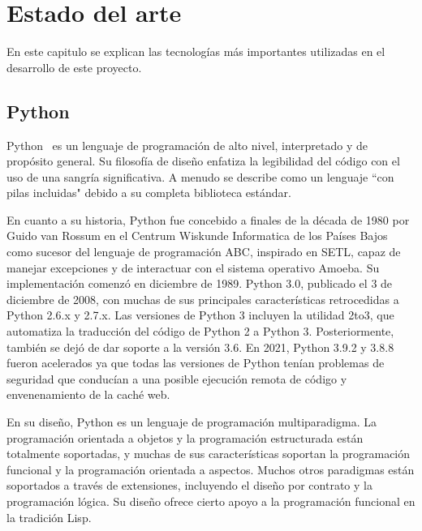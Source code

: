 \documentclass[a4paper, 12pt]{book}
\begin{document}

\cleardoublepage
\chapter{Estado del arte}
\label{chap:estado}

En este capitulo se explican las tecnologías más importantes utilizadas en el desarrollo de este proyecto.

\section{Python}
\label{sec:Python}

Python~\cite{website:Python} es un lenguaje de programación de alto nivel, interpretado y de propósito general. Su filosofía de diseño enfatiza la legibilidad del código con el uso de una sangría significativa. A menudo se describe como un lenguaje ``con pilas incluidas" debido a su completa biblioteca estándar. 

En cuanto a su historia, Python fue concebido a finales de la década de 1980 por Guido van Rossum en el Centrum Wiskunde Informatica de los Países Bajos como sucesor del lenguaje de programación ABC, inspirado en SETL, capaz de manejar excepciones y de interactuar con el sistema operativo Amoeba. Su implementación comenzó en diciembre de 1989. Python 3.0, publicado el 3 de diciembre de 2008, con muchas de sus principales características retrocedidas a Python 2.6.x y 2.7.x. Las versiones de Python 3 incluyen la utilidad 2to3, que automatiza la traducción del código de Python 2 a Python 3.
Posteriormente, también se dejó de dar soporte a la versión 3.6. En 2021, Python 3.9.2 y 3.8.8 fueron acelerados ya que todas las versiones de Python tenían problemas de seguridad que conducían a una posible ejecución remota de código y envenenamiento de la caché web.

En su diseño, Python es un lenguaje de programación multiparadigma. La programación orientada a objetos y la programación estructurada están totalmente soportadas, y muchas de sus características soportan la programación funcional y la programación orientada a aspectos. Muchos otros paradigmas están soportados a través de extensiones, incluyendo el diseño por contrato y la programación lógica. Su diseño ofrece cierto apoyo a la programación funcional en la tradición Lisp.
\end{document}

